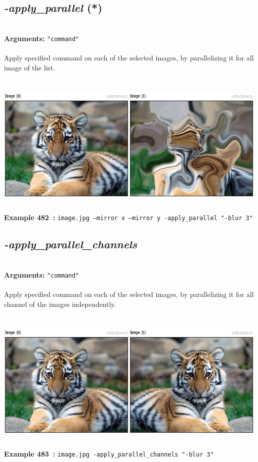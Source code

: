 \documentclass[a4paper,11pt,twoside]{book}
\begin{document}
\subsection{\emph{-apply\_parallel} (*)}\vspace*{-0.5em}
~\\\textbf{Arguments: } 
{\small \texttt{"command"}}\\~\\
Apply specified command on each of the selected images, by parallelizing it for all image of the list.
\begin{center}\includegraphics[keepaspectratio=true,height=7cm,width=\textwidth]{img/gmic_def482.jpg}\\
{\footnotesize \textbf{Example 482~:} \texttt{image.jpg --mirror x --mirror y -apply\_parallel "-blur 3"}}
\end{center}

\subsection{\emph{-apply\_parallel\_channels} }\vspace*{-0.5em}
~\\\textbf{Arguments: } 
{\small \texttt{"command"}}\\~\\
Apply specified command on each of the selected images, by parallelizing it for all channel of the images independently.
\begin{center}\includegraphics[keepaspectratio=true,height=7cm,width=\textwidth]{img/gmic_def483.jpg}\\
{\footnotesize \textbf{Example 483~:} \texttt{image.jpg -apply\_parallel\_channels "-blur 3"}}
\end{center}
\end{document}
